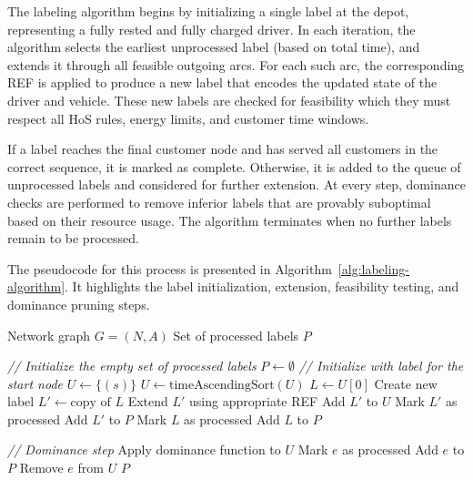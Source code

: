 \documentclass[trsc,dblanonrev]{informs4}
\begin{document}
The labeling algorithm begins by initializing a single label at the depot, representing a fully rested and fully charged driver. In each iteration, the algorithm selects the earliest unprocessed label (based on total time), and extends it through all feasible outgoing arcs. For each such arc, the corresponding REF is applied to produce a new label that encodes the updated state of the driver and vehicle. These new labels are checked for feasibility which they must respect all HoS rules, energy limits, and customer time windows.

If a label reaches the final customer node and has served all customers in the correct sequence, it is marked as complete. Otherwise, it is added to the queue of unprocessed labels and considered for further extension. At every step, dominance checks are performed to remove inferior labels that are provably suboptimal based on their resource usage. The algorithm terminates when no further labels remain to be processed.

The pseudocode for this process is presented in Algorithm~\ref{alg:labeling-algorithm}. It highlights the label initialization, extension, feasibility testing, and dominance pruning steps.

\begin{algorithm}
\caption{Labeling Algorithm}\label{alg:labeling-algorithm}
\vskip6pt
\begin{algorithmic}
\Require Network graph \( G = (N, A) \)
\Ensure Set of processed labels \( P \)

\Statex \textit{// Initialize the empty set of processed labels}
\State \( P \gets \emptyset \)
\Statex \textit{// Initialize with label for the start node}
\State \( U \gets \{(s)\} \)
    \State \( U \gets \text{timeAscendingSort}(U) \)
    \State \( L \gets U[0] \)
        \State Create new label \( L' \gets \text{copy of } L \)
        \State Extend \( L' \) using appropriate REF
            \State Add \( L' \) to \( U \)
                \State Mark \( L' \) as processed
                \State Add \( L' \) to \( P \)
            \EndIf
        \EndIf
    \EndFor
    \State Mark \( L \) as processed
    \State Add \( L \) to \( P \)

    \Statex \textit{// Dominance step}
    \State Apply dominance function to \( U \)
        \State Mark \( e \) as processed
        \State Add \( e \) to \( P \)
        \State Remove \( e \) from \( U \)
    \EndFor
\EndWhile
\State \Return \( P \)
\end{algorithmic}
\end{algorithm}
\end{document}
